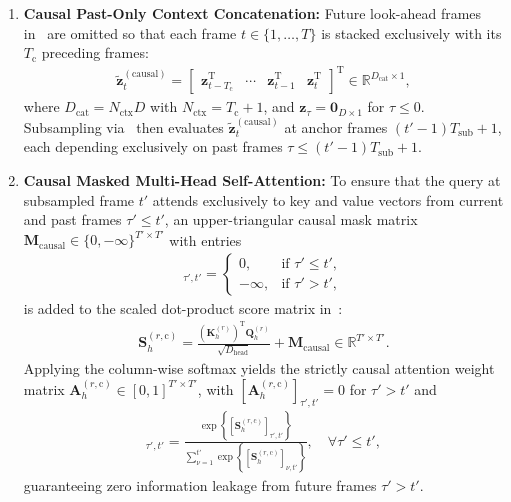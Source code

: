 \documentclass[lettersize,journal]{IEEEtran}
\begin{document}
\begin{enumerate}
  \item \textbf{Causal Past-Only Context Concatenation:} Future look-ahead frames in~ are omitted so that each frame $t \in \{1, \dots, T\}$ is stacked exclusively with its $T_{\mathrm{c}}$ preceding frames:
  \begin{align}
    \tilde{\mathbf{z}}_t^{(\mathrm{causal})} = \begin{bmatrix} \mathbf{z}_{t - T_{\mathrm{c}}}^{\mathrm{T}} & \cdots & \mathbf{z}_{t-1}^{\mathrm{T}} & \mathbf{z}_t^{\mathrm{T}} \end{bmatrix}^{\mathrm{T}} \in \mathbb{R}^{D_{\mathrm{cat}} \times 1},
    \label{eq:strict_causal_cat}
  \end{align}
  where $D_{\mathrm{cat}} = N_{\mathrm{ctx}} D$ with $N_{\mathrm{ctx}} = T_{\mathrm{c}} + 1$, and $\mathbf{z}_{\tau} = \mathbf{0}_{D \times 1}$ for $\tau \le 0$. Subsampling via~ then evaluates $\tilde{\mathbf{z}}_t^{(\mathrm{causal})}$ at anchor frames $(t'-1)T_{\mathrm{sub}} + 1$, each depending exclusively on past frames $\tau \le (t'-1)T_{\mathrm{sub}} + 1$.

  \item \textbf{Causal Masked Multi-Head Self-Attention:} To ensure that the query at subsampled frame $t'$ attends exclusively to key and value vectors from current and past frames $\tau' \le t'$, an upper-triangular causal mask matrix $\mathbf{M}_{\mathrm{causal}} \in \{0, -\infty\}^{T' \times T'}$ with entries
  \begin{align}
    [\mathbf{M}_{\mathrm{causal}}]_{\tau', t'} =
    \begin{cases}
      0, & \text{if } \tau' \le t', \\
      -\infty, & \text{if } \tau' > t',
    \end{cases}
    \label{eq:causal_mask}
  \end{align}
  is added to the scaled dot-product score matrix in~:
  \begin{align}
    \mathbf{S}_h^{(r,\mathrm{c})} = \frac{\left(\mathbf{K}_h^{(r)}\right)^{\mathrm{T}} \mathbf{Q}_h^{(r)}}{\sqrt{D_{\mathrm{head}}}} + \mathbf{M}_{\mathrm{causal}} \in \mathbb{R}^{T' \times T'}.
    \label{eq:causal_attention_scores}
  \end{align}
  Applying the column-wise softmax yields the strictly causal attention weight matrix $\mathbf{A}_h^{(r,\mathrm{c})} \in [0, 1]^{T' \times T'}$, with $[\mathbf{A}_h^{(r,\mathrm{c})}]_{\tau', t'} = 0$ for $\tau' > t'$ and
  \begin{align}
    [\mathbf{A}_h^{(r,\mathrm{c})}]_{\tau', t'} = \frac{\exp\!\left\{ [\mathbf{S}_h^{(r,\mathrm{c})}]_{\tau', t'} \right\}}{\sum_{\nu=1}^{t'} \exp\!\left\{ [\mathbf{S}_h^{(r,\mathrm{c})}]_{\nu, t'} \right\}}, \quad \forall \tau' \le t',
    \label{eq:causal_attention_weights}
  \end{align}
  guaranteeing zero information leakage from future frames $\tau' > t'$.


\end{enumerate}
\end{document}
